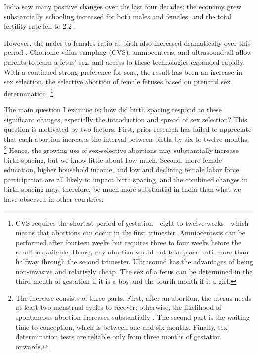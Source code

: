 \documentclass[12pt,letterpaper]{article}
\begin{document}


India saw many positive changes over the last four decades:
the economy grew substantially,
schooling increased for both males and females,
and the total fertility rate fell to 2.2 
\citep{Bosworth2008,Dharmalingam2014,
International-Institute-for-Population-Sciences-IIPS2017}.

However, the males-to-females ratio at birth also increased dramatically over this period
\citep{das_gupta97,Arnold2002,retherford03b,Guilmoto2012,Portner2015b,Jayachandran2017}.
Chorionic villus sampling (CVS), amniocentesis, and ultrasound all allow parents to learn 
a fetus' sex, and access to these technologies expanded rapidly.
With a continued strong preference for sons, the result has been an increase in sex 
selection, the selective abortion of female fetuses based on prenatal sex determination.%
\footnote{
CVS requires the shortest period of gestation---eight to twelve
weeks---which means that abortions can occur in the first trimester.
Amniocentesis can be performed after fourteen weeks but requires three
to four weeks before the result is available.
Hence, any abortion would not take place until more than halfway through the second 
trimester.
Ultrasound has the advantages of being non-invasive and relatively cheap.
The sex of a fetus can be determined in the third month of gestation if
it is a boy and the fourth month if it a girl.
}

The main question I examine is: how did birth spacing respond to these
significant changes, especially the introduction and spread of sex selection? 
This question is motivated by two factors. 
First, prior research has failed to appreciate that each abortion increases the
interval between births by six to twelve months.%
\footnote{
The increase consists of three parts. 
First, after an abortion, the uterus needs at least two menstrual cycles to recover; 
otherwise, the likelihood of spontaneous abortion increases substantially \citep{zhou00b}. 
The second part is the waiting time to conception, which is between one and six months. 
Finally, sex determination tests are reliable only from three months of gestation onwards.
}
Hence, the growing use of sex-selective abortions may substantially increase birth spacing, 
but we know little about how much. 
Second, more female education, higher household income, and low and declining female labor 
force participation are all likely to impact birth spacing, and the combined changes in 
birth spacing may, therefore, be much more substantial in India than what we have observed 
in other countries.
\end{document}
